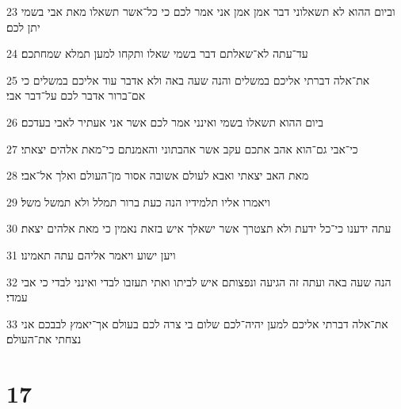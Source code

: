 \par 23 וביום ההוא לא תשאלוני דבר אמן אמן אני אמר לכם כי כל־אשר תשאלו מאת אבי בשמי יתן לכם׃
\par 24 עד־עתה לא־שאלתם דבר בשמי שאלו ותקחו למען תמלא שמחתכם׃
\par 25 את־אלה דברתי אליכם במשלים והנה שעה באה ולא אדבר עוד אליכם במשלים כי אם־ברור אדבר לכם על־דבר אבי׃
\par 26 ביום ההוא תשאלו בשמי ואינני אמר לכם אשר אני אעתיר לאבי בעדכם׃
\par 27 כי־אבי גם־הוא אהב אתכם עקב אשר אהבתוני והאמנתם כי־מאת אלהים יצאתי׃
\par 28 מאת האב יצאתי ואבא לעולם אשובה אסור מן־העולם ואלך אל־אבי׃
\par 29 ויאמרו אליו תלמידיו הנה כעת ברור תמלל ולא תמשל משל׃
\par 30 עתה ידענו כי־כל ידעת ולא תצטרך אשר ישאלך איש בזאת נאמין כי מאת אלהים יצאת׃
\par 31 ויען ישוע ויאמר אליהם עתה תאמינו׃
\par 32 הנה שעה באה ועתה זה הגיעה ונפצותם איש לביתו ואתי תעזבו לבדי ואינני לבדי כי אבי עמדי׃
\par 33 את־אלה דברתי אליכם למען יהיה־לכם שלום בי צרה לכם בעולם אך־יאמץ לבבכם אני נצחתי את־העולם׃

\chapter{17}

